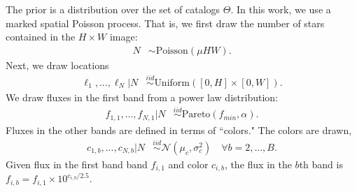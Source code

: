 The prior is a distribution over the set of catalogs $\Theta$. In this work, we use a marked spatial Poisson process. That is, we first draw the number of stars contained in the $H\times W$ image:
\begin{align}
	N &\sim \text{Poisson}(\mu HW).
\end{align}
Next, we draw locations
\begin{align}
  \ell_1, ..., \ell_N | N &\stackrel{iid}{\sim} \text{Uniform}([0, H] \times [0, W]). 
 \end{align}
We draw fluxes in the first band from a power law distribution:
\begin{align}
    f_{1, 1}, ..., f_{N,1} | N & 
    \stackrel{iid}{\sim} \text{Pareto}(f_{min}, \alpha) 
    \label{eq:flux_prior}.
\end{align}
Fluxes in the other bands are defined in terms of ``colors." The colors are drawn,
\begin{align}
  c_{1, b}, ..., c_{N,b} | N  & 
      \stackrel{iid}{\sim} \mathcal{N}(\mu_c, \sigma^2_c) \quad \forall b = 2, ..., B.
\end{align}
Given flux in the first band band $f_{i,1}$ and color $c_{i,b}$,
the flux in the $b$th band is  $f_{i,b} = f_{i,1} \times 10^{c_{i,b} / 2.5}$.




